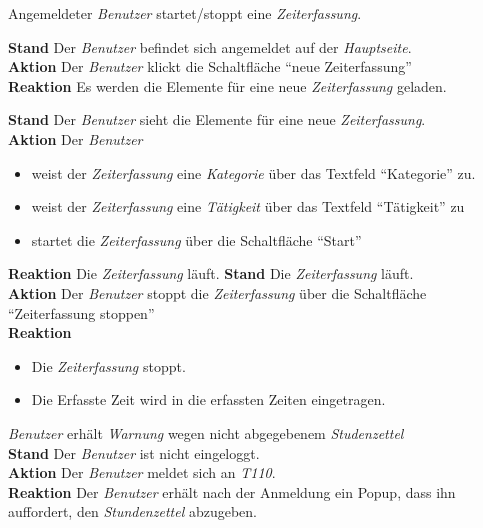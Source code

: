 \begin{requirements}
\begin{requirements}
	\end{requirements}
	 Angemeldeter \emph{Benutzer} startet/stoppt eine \emph{Zeiterfassung}.
	\begin{requirements}
            \textbf{Stand} Der \emph{Benutzer} befindet sich angemeldet auf der \emph{Hauptseite}. \\
            \textbf{Aktion} Der \emph{Benutzer} klickt die Schaltfläche "`neue Zeiterfassung"' \\
            \textbf{Reaktion} Es werden die Elemente für eine neue \emph{Zeiterfassung} geladen.
            \item
                \textbf{Stand} Der \emph{Benutzer} sieht die Elemente für eine neue \emph{Zeiterfassung}. \\
                \textbf{Aktion} Der \emph{Benutzer}
                    \begin{itemize}
                        \item weist der \emph{Zeiterfassung} eine \emph{Kategorie} über das Textfeld "`Kategorie"' zu.
                        \item weist der \emph{Zeiterfassung} eine \emph{Tätigkeit} über das Textfeld "`Tätigkeit"' zu
                        \item startet die \emph{Zeiterfassung} über die Schaltfläche "`Start"'
                    \end{itemize}
                \textbf{Reaktion} Die \emph{Zeiterfassung} läuft.
            \textbf{Stand} Die \emph{Zeiterfassung} läuft. \\
            \textbf{Aktion} Der \emph{Benutzer} stoppt die \emph{Zeiterfassung} über die Schaltfläche "`Zeiterfassung stoppen"' \\
            \textbf{Reaktion}
                \begin{itemize}
                    \item Die \emph{Zeiterfassung} stoppt.
                    \item Die Erfasste Zeit wird in die erfassten Zeiten eingetragen.
                \end{itemize}
	\end{requirements}


	 \emph{Benutzer} erhält \emph{Warnung} wegen nicht abgegebenem \emph{Studenzettel} \\
        \textbf{Stand} Der \emph{Benutzer} ist nicht eingeloggt. \\
        \textbf{Aktion} Der \emph{Benutzer} meldet sich an \emph{T110}. \\
        \textbf{Reaktion} Der \emph{Benutzer} erhält nach der Anmeldung ein Popup, dass ihn auffordert, den \emph{Stundenzettel} abzugeben.


\end{requirements}
